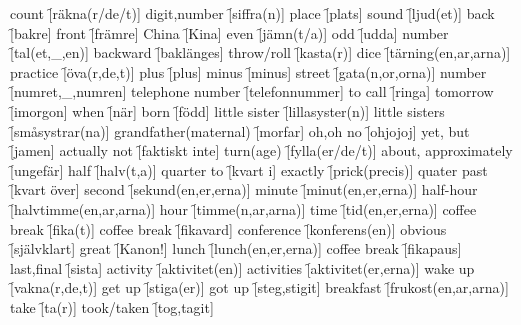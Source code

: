 \begin{questions}
    \begin{multicols}{2}
        \raggedcolumns
        \question count \f[räkna(r/de/t)]
        \question digit,number \f[siffra(n)]
        \question place \f[plats]
        \question sound \f[ljud(et)]
        \question back \f[bakre]
        \question front \f[främre]
        \question China \f[Kina]
        \question even \f[jämn(t/a)]
        \question odd  \f[udda]
        \question number \f[tal(et,\_,en)]
        \question backward \f[baklänges]
        \question throw/roll \f[kasta(r)]
        \question dice \f[tärning(en,ar,arna)]
        \question practice \f[öva(r,de,t)]
        \question plus \f[plus]
        \question minus \f[minus]
        \question street \f[gata(n,or,orna)]
        \question number \f[numret,\_,numren]
        \question telephone number \f[telefonnummer]
        \question to call \f[ringa]
        \question tomorrow \f[imorgon]
        \question when \f[när]
        \question born \f[född]
        \question little sister \f[lillasyster(n)]
        \question little sisters \f[småsystrar(na)]
        \question grandfather(maternal) \f[morfar]
        \question oh,oh no \f[ohjojoj]
        \question yet, but \f[jamen]
        \question actually not \f[faktiskt inte]
        \question turn(age) \f[fylla(er/de/t)]
        \question about, approximately \f[ungefär]
        \question half \f[halv(t,a)]
        \question quarter to \f[kvart i]
        \question exactly \f[prick(precis)]
        \question quater past \f[kvart över]
        \question second \f[sekund(en,er,erna)]
        \question minute \f[minut(en,er,erna)]
        \question half-hour \f[halvtimme(en,ar,arna)]
        \question hour \f[timme(n,ar,arna)]
        \question time \f[tid(en,er,erna)]
        \question coffee break \f[fika(t)]
        \question coffee break \f[fikavard]
        \question conference \f[konferens(en)]
        \question obvious \f[självklart]
        \question great \f[Kanon!]
        \question lunch \f[lunch(en,er,erna)]
        \question coffee break \f[fikapaus]
        \question last,final \f[sista]
        \question activity \f[aktivitet(en)]
        \question activities \f[aktivitet(er,erna)]
        \question wake up \f[vakna(r,de,t)]
        \question get up \f[stiga(er)]
        \question got up \f[steg,stigit]
        \question breakfast \f[frukost(en,ar,arna)]
        \question take \f[ta(r)]
        \question took/taken \f[tog,tagit]
    \end{multicols}
\end{questions}
